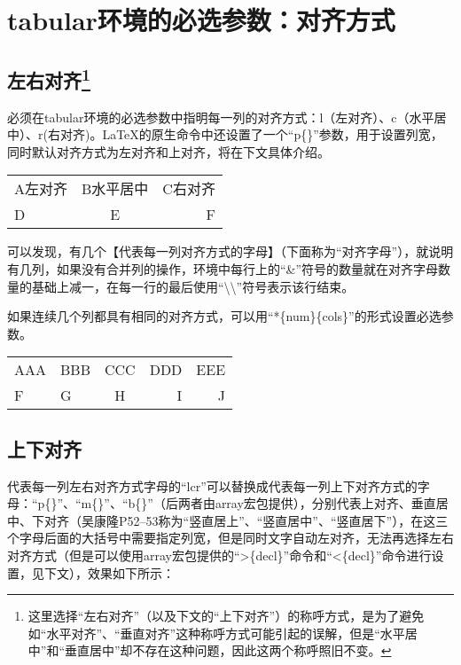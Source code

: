 ﻿\documentclass{article}
\begin{document}
\tableofcontents

\newpage

\section{tabular环境的必选参数：对齐方式}
\subsection{左右对齐\protect\footnote{这里选择``左右对齐''（以及下文的``上下对齐''）的称呼方式，是为了避免如``水平对齐''、``垂直对齐''这种称呼方式可能引起的误解，但是``水平居中''和``垂直居中''却不存在这种问题，因此这两个称呼照旧不变。}}
    必须在tabular环境的必选参数中指明每一列的对齐方式：l（左对齐）、c（水平居中）、r(右对齐)。\LaTeX 的原生命令中还设置了一个``p\{\}''参数，用于设置列宽，同时默认对齐方式为左对齐和上对齐，将在下文具体介绍。

    \mbox{}

    \begin{tabular}{|lcr|}
        A左对齐&B水平居中&C右对齐\\
        D&E&F\\
    \end{tabular}

    \mbox{}

    可以发现，有几个【代表每一列对齐方式的字母】（下面称为``对齐字母''），就说明有几列，如果没有合并列的操作，环境中每行上的``\&''符号的数量就在对齐字母数量的基础上减一，在每一行的最后使用``\textbackslash\textbackslash''符号表示该行结束。

    如果连续几个列都具有相同的对齐方式，可以用``*\{num\}\{cols\}''的形式设置必选参数。

    \mbox{}

    \begin{tabular}{|*{2}{l}c*{2}{r}|}
        AAA&BBB&CCC&DDD&EEE\\
        F&G&H&I&J\\
    \end{tabular}

\subsection{上下对齐}
    代表每一列左右对齐方式字母的``lcr''可以替换成代表每一列上下对齐方式的字母：``p\{\}''、``m\{\}''、``b\{\}''（后两者由array宏包提供），分别代表上对齐、垂直居中、下对齐（吴康隆P52--53称为``竖直居上''、``竖直居中''、``竖直居下''），在这三个字母后面的大括号中需要指定列宽，但是同时文字自动左对齐，无法再选择左右对齐方式（但是可以使用array宏包提供的``>\{decl\}''命令和``<\{decl\}''命令进行设置，见下文），效果如下所示：
\end{document}
